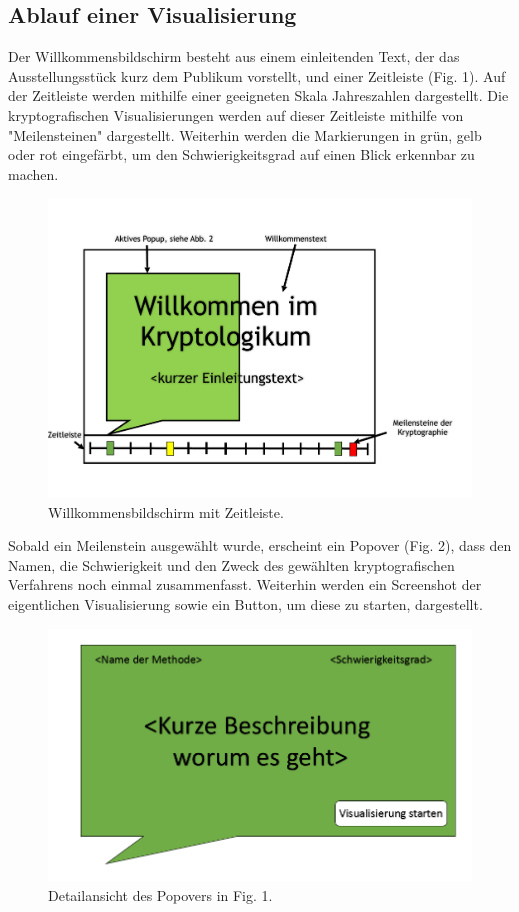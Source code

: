 \documentclass{article}
\begin{document}
\subsection{Ablauf einer Visualisierung}

Der Willkommensbildschirm besteht aus einem einleitenden Text, der das Ausstellungsstück kurz dem Publikum vorstellt, und einer Zeitleiste (Fig. 1). Auf der Zeitleiste werden mithilfe einer geeigneten Skala Jahreszahlen dargestellt. Die kryptografischen Visualisierungen werden auf dieser Zeitleiste mithilfe von "Meilensteinen" dargestellt. Weiterhin werden die Markierungen in grün, gelb oder rot eingefärbt, um den Schwierigkeitsgrad auf einen Blick erkennbar zu machen.

\begin{figure}[H]
  \centering
    \includegraphics[width=\textwidth]{resources/ui_walkthrough_start-draft}
  \caption{Willkommensbildschirm mit Zeitleiste.}
\end{figure}

Sobald ein Meilenstein ausgewählt wurde, erscheint ein Popover (Fig. 2), dass den Namen, die Schwierigkeit und den Zweck des gewählten kryptografischen Verfahrens noch einmal zusammenfasst. Weiterhin werden ein Screenshot der eigentlichen Visualisierung sowie ein Button, um diese zu starten, dargestellt.

\begin{figure}[H]
  \centering
    \includegraphics[width=\textwidth]{resources/ui_walkthrough_popover-draft}
  \caption{Detailansicht des Popovers in Fig. 1.}
\end{figure}
\end{document}
